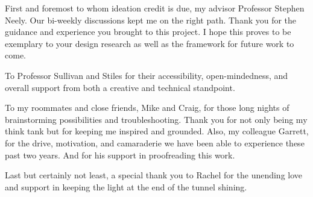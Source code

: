 
\setlength{\parskip}{1em}
\setlength{\parindent}{0em}

\noindent
First and foremost to whom ideation credit is due, my advisor Professor Stephen Neely. Our bi-weekly discussions kept me on the right path. Thank you for the guidance and experience you brought to this project. I hope this proves to be exemplary to your design research as well as the framework for future work to come.

To Professor Sullivan and Stiles for their accessibility, open-mindedness, and overall support from both a creative and technical standpoint.

To my roommates and close friends, Mike and Craig, for those long nights of brainstorming possibilities and troubleshooting. Thank you for not only being my think tank but for keeping me inspired and grounded. Also, my colleague Garrett, for the drive, motivation, and camaraderie we have been able to experience these past two years. And for his support in proofreading this work.

Last but certainly not least, a special thank you to Rachel for the unending love and support in keeping the light at the end of the tunnel shining.